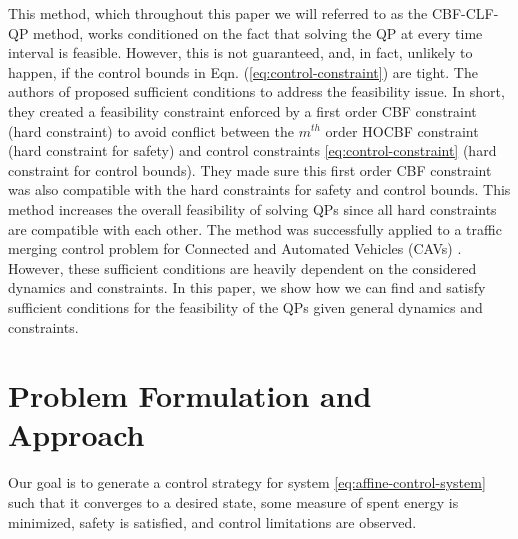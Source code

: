 \documentclass[letterpaper, 10 pt, conference]{ieeeconf}
\theoremstyle{definition}
\newcommand{\calin}[1]{\textcolor{red}   {[Calin: #1]}}
\begin{document}
This method, which throughout this paper we will referred to as the CBF-CLF-QP method, works conditioned on the fact that solving the QP at every time interval is feasible. 
However, this is not guaranteed, and, in fact, unlikely to happen, if the control bounds in Eqn. (\ref{eq:control-constraint}) are tight. The authors of \cite{xiao2022sufficient} proposed sufficient conditions to address the feasibility issue. In short, they created a feasibility constraint enforced by a first order CBF constraint (hard constraint) to avoid conflict between the $m^{th}$ order HOCBF constraint (hard constraint for safety) and control constraints \eqref{eq:control-constraint} (hard constraint for control bounds). They  made sure this first order CBF constraint was also compatible with the hard constraints for safety and control bounds. This method increases the overall feasibility of solving QPs since all hard constraints are compatible with each other. The method was successfully applied to a traffic merging control problem for Connected and Automated Vehicles (CAVs) \cite{xu2022feasibility}. 
However, these sufficient conditions are heavily dependent on the considered dynamics and constraints. 
In this paper, we show how we can find and satisfy sufficient conditions for the feasibility of the QPs given general dynamics and constraints.

\section{Problem Formulation and Approach}
\label{sec:Problem Formulation and Approach}


Our goal is to generate a control strategy for system \eqref{eq:affine-control-system} such that it converges to a desired state, some measure of spent energy is minimized, safety is satisfied, and control limitations are observed. 
\end{document}
